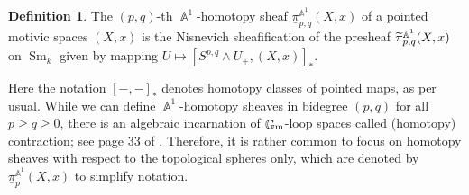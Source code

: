 \documentclass[english]{amsart}
\theoremstyle{definition}
\newtheorem{de}[prop]{Definition}
\DeclareMathOperator{\A}{\mathbb{A}}
\DeclareMathOperator{\G}{\mathbb{G}}
\DeclareMathOperator{\Sm}{Sm}
\begin{document}
\begin{de}
The $(p,q)$-th $\A^1$-homotopy sheaf $\underline{\pi}_{p,q}^{\A^1}(X,x)$ of a pointed motivic spaces $(X,x)$ is the Nisnevich sheafification of the presheaf $\widetilde{\phantom{\pi}}\hspace{-6pt}\pi_{p,q}^{\A^1}(X,x)$ on $\Sm_k$ given by mapping $U \mapsto [S^{p,q}\wedge U_+,(X,x)]_*$.
\end{de}
Here the notation $[-,-]_*$ denotes homotopy classes of pointed maps, as per usual. While we can define $\A^1$-homotopy sheaves in bidegree $(p,q)$ for all $p \geq q \geq 0$, there is an algebraic incarnation of $\G_{\rm m}$-loop spaces called (homotopy) contraction; see page 33 of \cite{MR2934577}. Therefore, it is rather common to focus on homotopy sheaves with respect to the topological spheres only, which are denoted by $\underline{\pi}_p^{\A^1}\!(X,x)$ to simplify notation. 

\hfill
\end{document}
